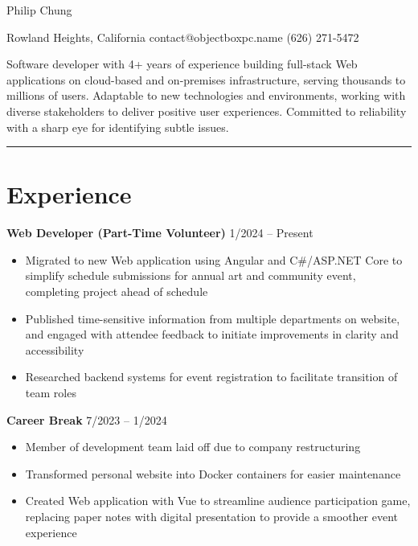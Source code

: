 \documentclass[12pt]{article}
\newcommand{\primaryheader}[4]{
	\textbf{#1}
	\ifthenelse{\equal{#3}{}}{}{%
		\symbol{"B7} #3 \ifthenelse{\equal{#4}{}}{}{(#4)}
	}
	\hfill #2%
}
\begin{document}
	{\centering

		{\headerfont\fontsize{24pt}{24pt}\selectfont Philip Chung}

		\vspace{0.25em}

		{\fontsize{10pt}{10pt}\selectfont Rowland Heights, California  contact@objectboxpc.name  (626) 271-5472}

	}

	\vspace{0.25em}

	{\fontsize{11pt}{14pt}\selectfont

		Software developer with 4+ years of experience building full-stack Web applications on cloud-based and on-premises infrastructure, serving thousands to millions of users. Adaptable to new technologies and environments, working with diverse stakeholders to deliver positive user experiences. Committed to reliability with a sharp eye for identifying subtle issues.

	}

	\rule{\textwidth}{1pt}

	\section*{Experience}

	\primaryheader{Web Developer (Part-Time Volunteer)}{1/2024 -- Present}{PNW}{Remote}

	\begin{itemize}
		\item Migrated to new Web application using Angular and C\#/ASP.NET Core to simplify schedule submissions for annual art and community event, completing project ahead of schedule
		\item Published time-sensitive information from multiple departments on website, and engaged with attendee feedback to initiate improvements in clarity and accessibility
		\item Researched backend systems for event registration to facilitate transition of team roles
	\end{itemize}

	\primaryheader{Career Break}{7/2023 -- 1/2024}{}{}

	\begin{itemize}
		\item Member of development team laid off due to company restructuring
		\item Transformed personal website into Docker containers for easier maintenance
		\item Created Web application with Vue to streamline audience participation game, replacing paper notes with digital presentation to provide a smoother event experience
	\end{itemize}
\end{document}
